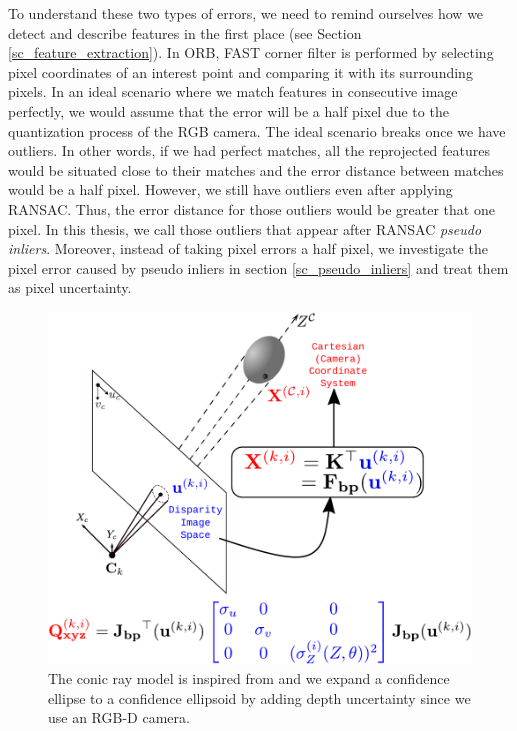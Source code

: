 \documentclass[12pt]{report}
\numberwithin{figure}{section}
\begin{document}
To understand these two types of errors, we need to remind ourselves how we
detect and describe features in the first
place (see Section \ref{sc_feature_extraction}).  In ORB, FAST corner filter 
is performed by selecting pixel coordinates
of an interest point and comparing it with its surrounding pixels. In an ideal
scenario where we match features in consecutive image perfectly, we would
assume that the error will be a half pixel due to the quantization process of
the RGB camera.  The ideal scenario breaks once we have outliers. 
In other words, if we had perfect matches, all the reprojected features would
be situated close to their matches and the error distance between matches
would be a half pixel. However, we still have outliers even after applying
RANSAC. Thus, the error distance for those outliers would be greater that one
pixel.  In this thesis, we call those outliers that appear after RANSAC
\textit{pseudo inliers}. Moreover, instead of taking pixel errors a half pixel,
we investigate the pixel error caused by pseudo inliers in section
\ref{sc_pseudo_inliers} and treat them as pixel uncertainty.

\begin{figure}[H] \centering
\includegraphics[width=0.7\linewidth,natwidth=640,natheight=640]
{fig/drawings/conic_ray.pdf} \caption[The Conic Ray Error Model]{ The conic ray
model is inspired from \parencite{Sola2007a} and we expand a confidence 
ellipse 
to a
confidence ellipsoid by adding depth uncertainty since we use an RGB-D camera.}
\label{fig:conic_ray_3d_error_model} \end{figure}
\end{document}

